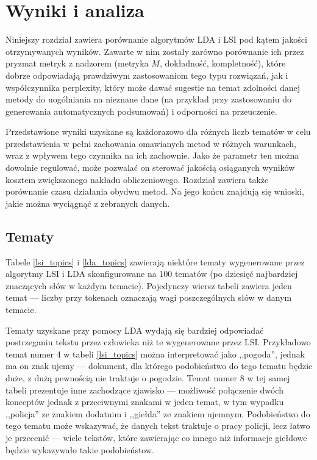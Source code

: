 \documentclass[11pt,a4paper]{article}
\begin{document}
\section{Wyniki i analiza}
\label{sec:results}

Niniejszy rozdział zawiera porównanie algorytmów LDA i LSI pod kątem jakości
otrzymywanych wyników. Zawarte w nim zostały zarówno porównanie ich przez
pryzmat metryk z nadzorem (metryka $M$, dokładność, kompletność), które dobrze
odpowiadają prawdziwym zastosowaniom tego typu rozwiązań, jak i współczynnika
perplexity, który może dawać sugestie na temat zdolności danej metody do
uogólniania na nieznane dane (na przykład przy zastosowaniu do generowania
automatycznych podsumowań) i odporności na przeuczenie.

Przedstawione wyniki uzyskane są każdorazowo dla różnych liczb tematów w celu
przedstawienia w pełni zachowania omawianych metod w różnych warunkach, wraz z
wpływem tego czynnika na ich zachownie. Jako że parametr ten można dowolnie
regulować, może pozwalać on sterować jakością osiąganych wyników kosztem
zwiększonego nakładu obliczeniowego. Rozdział zawiera także porównanie czasu
działania obydwu metod. Na jego końcu znajdują się wnioski, jakie można
wyciągnąć z zebranych danych.

\subsection{Tematy}
Tabele \ref{lsi_topics} i \ref{lda_topics} zawierają niektóre tematy
wygenerowane przez algorytmy LSI i LDA skonfigurowane na 100 tematów (po
dziesięć najbardziej znaczących słów w każdym temacie). Pojedynczy wiersz
tabeli zawiera jeden temat --- liczby przy tokenach oznaczają wagi poszczególnych
słów w danym temacie.

Tematy uzyskane przy pomocy LDA wydają się bardziej odpowiadać postrzeganiu
tekstu przez człowieka niż te wygenerowane przez LSI.  Przykładowo temat numer
4 w tabeli \ref{lsi_topics} można interpretować jako ,,pogoda'', jednak ma on
znak ujemy --- dokument, dla którego podobieństwo do tego tematu będzie duże, z
dużą pewnością nie traktuje o pogodzie. Temat numer 8 w tej samej tabeli
prezentuje inne zachodzące zjawisko --- możliwość połączenie dwóch konceptów
jednak z przeciwnymi znakami w jeden temat, w tym wypadku ,,policja'' ze
znakiem dodatnim i ,,giełda'' ze znakiem ujemnym. Podobieństwo do tego tematu
może wskazywać, że danych tekst traktuje o pracy policji, lecz łatwo je
przecenić --- wiele tekstów, które zawierając co innego niż informacje giełdowe
będzie wykazywało takie podobieństow.
\end{document}
